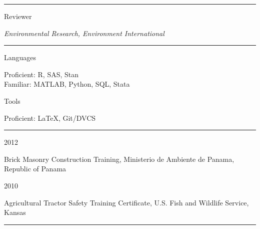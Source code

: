 \documentclass[a4paper,10pt]{article}
\newlength{\cvcolumngapwidth}
\newlength{\cvleftcolumnwidth}
\newlength{\cvrightcolumnwidth}
\newcommand{\cvsectionstyle}[1]{{\normalsize\cvsectionfont\textcolor{cvsectioncolor}{#1}}}
\newcommand{\cvdurationstyle}[1]{{\small\cvdurationfont\textcolor{cvdurationcolor}{#1}}}
\newlength{\cvafteritemskipamount}
\newlength{\cvaftersectionskipamount}
\newlength{\cvparskip}
\newcommand{\cvsection}[1]{
    \begin{minipage}[t]{\cvleftcolumnwidth}
        \raggedleft\cvsectionstyle{#1}
    \end{minipage}%
    \hspace{\cvcolumngapwidth}%
    \begin{minipage}[t]{\cvrightcolumnwidth}
        \textcolor{cvrulecolor}{\rule{\cvrightcolumnwidth}{0.3mm}}
    \end{minipage}

    \vspace{\cvaftersectionskipamount}
}
\newcommand{\cvitem}[2]{
    \begin{minipage}[t]{\cvleftcolumnwidth}
        \raggedleft #1
    \end{minipage}%
    \hspace{\cvcolumngapwidth}%
    \begin{minipage}[t]{\cvrightcolumnwidth}
        \setlength{\parskip}{\cvparskip} #2
    \end{minipage}

    \vspace{\cvafteritemskipamount}
}
\begin{document}

\cvsection{ACADEMIC SERVICE}

\cvitem{
    \cvdurationstyle{Reviewer}
}{
    \textit{Environmental Research, Environment International} 
}


\cvsection{PROGRAMMING SKILLS}

\cvitem{
    \cvdurationstyle{Languages}
}{
    Proficient: R, SAS, Stan \\
    Familiar: MATLAB, Python, SQL, Stata
}
\cvitem{
    \cvdurationstyle{Tools}
}{
    Proficient: \LaTeX, Git/DVCS
}


\cvsection{CERTIFICATIONS AND TRAININGS}

\cvitem{
    \cvdurationstyle{2012}
}{
    Brick Masonry Construction Training, Ministerio de Ambiente de Panama, Republic of Panama
}
\cvitem{
    \cvdurationstyle{2010}
}{
    Agricultural Tractor Safety Training Certificate, U.S. Fish and Wildlife Service, Kansas		     
}

\cvsection{PUBLICATIONS}
\end{document}
